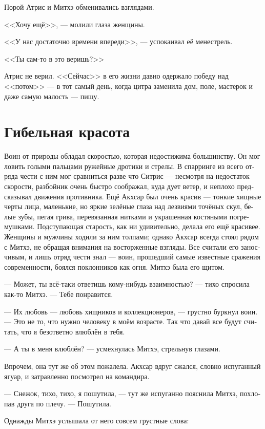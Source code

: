 \documentclass[a4paper,12pt,fleqn]{book}\usepackage{polyglossia}\setdefaultlanguage[babelshorthands=true]{russian}\setotherlanguage{english}\defaultfontfeatures{Ligatures=TeX,Mapping=tex-text}\usepackage{xcolor}\newcommand{\ml}[3]{#2}
\begin{document}
{Порой Атрис и Митхэ обменивались взглядами.

<<Хочу ещё>>, --- молили глаза женщины.

<<У нас достаточно времени впереди>>, --- успокаивал её менестрель.

<<Ты сам-то в это веришь?>>

Атрис не верил.
<<Сейчас>> в его жизни давно одержало победу над <<потом>> --- в тот самый день, когда цитра заменила дом, поле, мастерок и даже самую малость --- пищу.

\section{Гибельная красота}

Воин от природы обладал скоростью, которая недостижима большинству.
Он мог ловить голыми пальцами ружейные дротики и стрелы.
В спарринге из всего отряда чести с ним мог сравниться разве что Ситрис --- несмотря на недостаток скорости, разбойник очень быстро соображал, куда дует ветер, и неплохо предсказывал движения противника.
Ещё Акхсар был очень красив --- тонкие хищные черты лица, маленькие, но яркие зелёные глаза над лезвиями точёных скул, белые зубы, пегая грива, перевязанная нитками и украшенная костяными погремушками.
Подступающая старость, как ни удивительно, делала его ещё красивее.
Женщины и мужчины ходили за ним толпами;
однако Акхсар всегда стоял рядом с Митхэ, не обращая внимания на восторженные взгляды.
Все считали его заносчивым, и лишь отряд чести знал --- воин, прошедший самые известные сражения современности, боялся поклонников как огня.
Митхэ была его щитом.

--- Может, ты всё-таки ответишь кому-нибудь взаимностью? --- тихо спросила как-то Митхэ.
--- Тебе понравится.

--- Их любовь --- любовь хищников и коллекционеров, --- грустно буркнул воин.
--- Это не то, что нужно человеку в моём возрасте.
Так что давай все будут считать, что я безответно влюблён в тебя.

--- А ты в меня влюблён? --- усмехнулась Митхэ, стрельнув глазами.

Впрочем, она тут же об этом пожалела.
Акхсар вдруг сжался, словно испуганный ягуар, и затравленно посмотрел на командира.

--- Снежок, тихо, тихо, я пошутила, --- тут же испуганно пояснила Митхэ, похлопав друга по плечу.
--- Пошутила.

Однажды Митхэ услышала от него совсем грустные слова:

}
\end{document}

